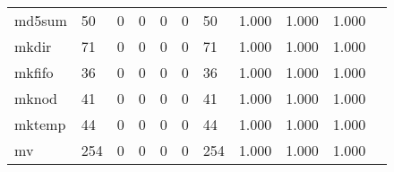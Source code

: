 \begin{longtable}{lp{1.20cm}p{1.20cm}p{1.20cm}p{1.20cm}p{1.20cm}p{1.20cm}p{1.20cm}p{1.20cm}p{1.20cm}p{1.20cm}}
md5sum    &                                    50 &                                                  0 &                                                  0 &                                                  0 &                                                  0 &                                                 50 &                                         1.000 &                                              1.000 &                                              1.000 \\
mkdir     &                                    71 &                                                  0 &                                                  0 &                                                  0 &                                                  0 &                                                 71 &                                         1.000 &                                              1.000 &                                              1.000 \\
mkfifo    &                                    36 &                                                  0 &                                                  0 &                                                  0 &                                                  0 &                                                 36 &                                         1.000 &                                              1.000 &                                              1.000 \\
mknod     &                                    41 &                                                  0 &                                                  0 &                                                  0 &                                                  0 &                                                 41 &                                         1.000 &                                              1.000 &                                              1.000 \\
mktemp    &                                    44 &                                                  0 &                                                  0 &                                                  0 &                                                  0 &                                                 44 &                                         1.000 &                                              1.000 &                                              1.000 \\
mv        &                                   254 &                                                  0 &                                                  0 &                                                  0 &                                                  0 &                                                254 &                                         1.000 &                                              1.000 &                                              1.000 \\

\end{longtable}
